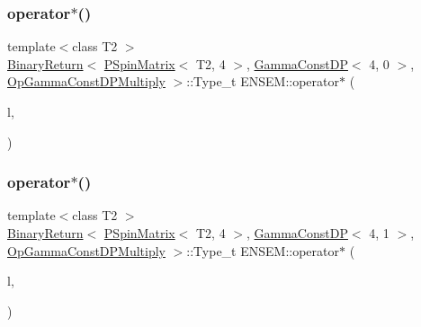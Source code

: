\subsubsection{\texorpdfstring{operator$\ast$()}{operator*()}\hspace{0.1cm}{\footnotesize\ttfamily [49/64]}}
{\footnotesize\ttfamily template$<$class T2 $>$ \\
\mbox{\hyperlink{structENSEM_1_1BinaryReturn}{Binary\+Return}}$<$ \mbox{\hyperlink{classENSEM_1_1PSpinMatrix}{P\+Spin\+Matrix}}$<$ T2, 4 $>$, \mbox{\hyperlink{classENSEM_1_1GammaConstDP}{Gamma\+Const\+DP}}$<$ 4, 0 $>$, \mbox{\hyperlink{structENSEM_1_1OpGammaConstDPMultiply}{Op\+Gamma\+Const\+D\+P\+Multiply}} $>$\+::Type\+\_\+t E\+N\+S\+E\+M\+::operator$\ast$ (\begin{DoxyParamCaption}\item[{const \mbox{\hyperlink{classENSEM_1_1PSpinMatrix}{P\+Spin\+Matrix}}$<$ T2, 4 $>$ \&}]{l,  }\item[{const \mbox{\hyperlink{classENSEM_1_1GammaConstDP}{Gamma\+Const\+DP}}$<$ 4, 0 $>$ \&}]{ }\end{DoxyParamCaption})\hspace{0.3cm}{\ttfamily [inline]}}

\mbox{\label{group__primspinmatrix_gae75fd887b0fbf22c05f8739b68d7428c}} 
\subsubsection{\texorpdfstring{operator$\ast$()}{operator*()}\hspace{0.1cm}{\footnotesize\ttfamily [50/64]}}
{\footnotesize\ttfamily template$<$class T2 $>$ \\
\mbox{\hyperlink{structENSEM_1_1BinaryReturn}{Binary\+Return}}$<$ \mbox{\hyperlink{classENSEM_1_1PSpinMatrix}{P\+Spin\+Matrix}}$<$ T2, 4 $>$, \mbox{\hyperlink{classENSEM_1_1GammaConstDP}{Gamma\+Const\+DP}}$<$ 4, 1 $>$, \mbox{\hyperlink{structENSEM_1_1OpGammaConstDPMultiply}{Op\+Gamma\+Const\+D\+P\+Multiply}} $>$\+::Type\+\_\+t E\+N\+S\+E\+M\+::operator$\ast$ (\begin{DoxyParamCaption}\item[{const \mbox{\hyperlink{classENSEM_1_1PSpinMatrix}{P\+Spin\+Matrix}}$<$ T2, 4 $>$ \&}]{l,  }\item[{const \mbox{\hyperlink{classENSEM_1_1GammaConstDP}{Gamma\+Const\+DP}}$<$ 4, 1 $>$ \&}]{ }\end{DoxyParamCaption})\hspace{0.3cm}{\ttfamily [inline]}}

